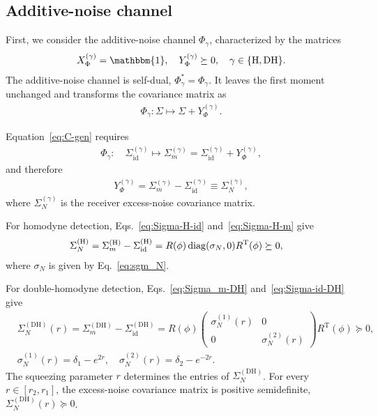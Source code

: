 \documentclass[%
final, 
superscriptaddress,
 amsmath,amssymb,amsfonts,
 aps,
 pra,
 longbibliography,
]{revtex4-2}
\newcommand{\tcnj}[1]{{#1}^{\mathrm{T}}}
\newcommand{\diag}{\mathop{\rm diag}\nolimits}
\newcommand{\ind}[1]{\mathrm{#1}}
\begin{document}
\subsection{Additive-noise channel}
First, we consider the additive-noise channel $\Phi_{\gamma}$, characterized by the matrices~\cite{Serafini:bk:2023}
\begin{align}
    \label{eq:X,Y-phi}
    X_{\Phi}^{(\gamma)}=\mathbbm{1}, \quad Y_{\Phi}^{(\gamma)}\succeq0, \quad \gamma\in\{\ind{H}, \ind{DH}\}.
\end{align}
The additive-noise channel is self-dual, $\Phi_\gamma^{*}=\Phi_\gamma$. It leaves the first moment unchanged and transforms the covariance matrix as
\begin{align}
  \Phi_\gamma:
  \Sigma\mapsto
  \Sigma+Y_{\Phi}^{(\gamma)}.
\end{align}

Equation~\eqref{eq:C-gen} requires
\begin{align}
  \label{eq:add-act}
  \Phi_{\gamma}:\quad \Sigma_{\ind{id}}^{(\gamma)}\mapsto\Sigma_m^{(\gamma)}=\Sigma_{\ind{id}}^{(\gamma)}+Y_{\Phi}^{(\gamma)},
\end{align}
and therefore
\begin{align}
  Y_{\Phi}^{(\gamma)}=\Sigma_{m}^{(\gamma)}-\Sigma_{\ind{id}}^{(\gamma)}\equiv \Sigma_{N}^{(\gamma)},
\end{align}
where $\Sigma_{N}^{(\gamma)}$ is the receiver excess-noise covariance matrix.

For homodyne detection, Eqs.~\eqref{eq:Sigma-H-id} and~\eqref{eq:Sigma-H-m} give
\begin{align}
    &
    \label{eq:Sigma-N-H}
    \Sigma_{N}^{(\ind{H})}=
    \Sigma_{m}^{(\ind{H})}-\Sigma_{\ind{id}}^{(\ind{H})}= R(\phi)
    \diag(\sigma_N, 0)
    \tcnj{R}(\phi)\succeq 0,
\end{align}
where $\sigma_N$ is given by Eq.~\eqref{eq:sgm_N}.

For double-homodyne detection, Eqs.~\eqref{eq:Sigma_m-DH} and~\eqref{eq:Sigma-id-DH} give
\begin{align}
  &
    \label{eq:Sigma-N-DH}
    \Sigma_{N}^{(\ind{DH})}(r)=
    \Sigma_{m}^{(\ind{DH})}-\Sigma_{\ind{id}}^{(\ind{DH})}= R(\phi)
\begin{pmatrix}
      \sigma_N^{(1)}(r) &0\\0&\sigma_N^{(2)}(r)
    \end{pmatrix}
    \tcnj{R}(\phi)\succeq 0,\\
  \label{eq:sigma_N-sq-2}
  &
    \sigma_N^{(1)}(r)=\delta_1-e^{2r},
    \quad
    \sigma_N^{(2)}(r)=\delta_2-e^{-2r}.
\end{align}
The squeezing parameter $r$ determines the entries of $\Sigma_{N}^{(\ind{DH})}$. For every $r\in[r_2,r_1]$, the excess-noise covariance matrix is positive semidefinite, $\Sigma_{N}^{(\ind{DH})}(r)\succeq0$.
\end{document}
